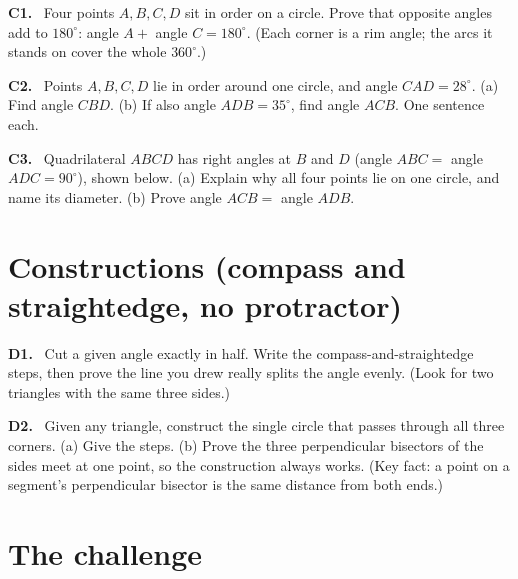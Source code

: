 \documentclass[11pt]{article}
\newcommand{\drawbox}[1]{%
  \par\vspace{4pt}\noindent
  \fbox{\rule{0pt}{#1}\rule{\dimexpr\linewidth-2\fboxsep-2\fboxrule}{0pt}}%
  \par\vspace{6pt}}
\newcommand{\prob}[1]{\par\medskip\noindent\textbf{\color{benblue}#1}\ \ignorespaces}
\begin{document}
\prob{C1.} Four points $A, B, C, D$ sit in order on a circle. Prove that opposite
angles add to $180^\circ$: angle $A + $ angle $C = 180^\circ$. (Each corner is a
rim angle; the arcs it stands on cover the whole $360^\circ$.)
\drawbox{2.8cm}

\prob{C2.} Points $A, B, C, D$ lie in order around one circle, and angle
$CAD = 28^\circ$.
(a) Find angle $CBD$. (b) If also angle $ADB = 35^\circ$, find angle $ACB$. One
sentence each.
\drawbox{2cm}

\prob{C3.} Quadrilateral $ABCD$ has right angles at $B$ and $D$
(angle $ABC = $ angle $ADC = 90^\circ$), shown below. (a) Explain why all four
points lie on one circle, and name its diameter. (b) Prove angle $ACB = $ angle
$ADB$.

\begin{center}
\end{center}
\drawbox{2.4cm}

\section*{Constructions (compass and straightedge, no protractor)}

\prob{D1.} Cut a given angle exactly in half. Write the compass-and-straightedge
steps, then prove the line you drew really splits the angle evenly. (Look for two
triangles with the same three sides.)
\drawbox{4cm}

\prob{D2.} Given any triangle, construct the single circle that passes through all
three corners. (a) Give the steps. (b) Prove the three perpendicular bisectors of
the sides meet at one point, so the construction always works. (Key fact: a point
on a segment's perpendicular bisector is the same distance from both ends.)
\drawbox{4cm}

\section*{The challenge}
\end{document}
